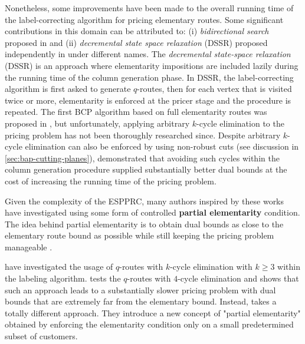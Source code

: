 Nonetheless, some improvements have been made to the overall running time
of the label-correcting algorithm for pricing elementary routes.
Some significant contributions in this domain can be attributed to:
(i) \textit{bidirectional search} proposed in \textcite{righini2006}
and (ii) \textit{decremental state space relaxation} (DSSR) proposed independently in
\textcite{boland2006, righini2008} under different names.
The \textit{decremental state-space relaxation} (DSSR)
is an approach where elementarity impositions are included lazily
during the running time of the column generation phase.
In DSSR, the label-correcting algorithm
is first asked to generate $q$-routes, then for each vertex that is visited
twice or more, elementarity is enforced at the pricer stage
and the procedure is repeated.
The first BCP algorithm based on full elementarity routes
was proposed in \cite{chabrier2006}, but unfortunately,
applying arbitrary $k$-cycle elimination to the pricing problem
has not been thoroughly researched since.
Despite arbitrary $k$-cycle elimination can also
be enforced by using non-robust cuts (see discussion in \cref{sec:bap-cutting-planes}),
\citeauthor{feillet2004} demonstrated that avoiding such cycles
within the column generation procedure supplied
substantially better dual bounds at the cost
of increasing the running time of the pricing problem.

\medskip

Given the complexity of the ESPPRC,
many authors inspired by these works have investigated using
some form of controlled \textbf{partial elementarity} condition.
The idea behind partial elementarity is to obtain dual bounds
as close to the elementary route bound as possible
while still keeping the pricing problem manageable \parencite{contardo2015}.

\textcite{irnich2006, fukasawa2006} have investigated the usage of
$q$-routes with $k$-cycle elimination with $k \ge 3$ within the labeling algorithm.
\textcite{fukasawa2006} tests the $q$-routes with $4$-cycle elimination
and shows that such an approach leads to a substantially slower pricing problem
with dual bounds that are extremely far from the elementary bound.
Instead, \textcite{desaulniers2008} takes a totally different approach.
They introduce a new concept of "partial elementarity"
obtained by enforcing the elementarity condition
only on a small predetermined subset of customers.

